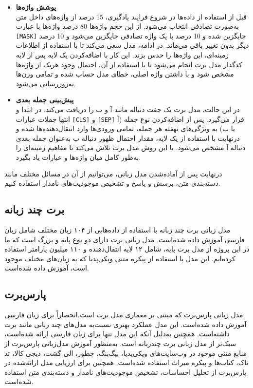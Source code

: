 \begin{itemize}
\item \textbf{پوشش واژه‌ها} \\
قبل از استفاده از داده‌ها در شروع فرایند یادگیری، 15 درصد از واژه‌های داخل متن به‌صورت تصادفی انتخاب می‌شود. 
 از این حجم واژه‌ها 80‌ درصد واژه‌ها با عبارت \verb|[MASK]| جایگزین شده و 10 درصد با یک واژه تصادفی جایگزین می‌شود و 10
 درصد دیگر بدون تغییر باقی می‌ماند. در ادامه، مدل سعی می‌کند تا با استفاده از اطلاعات زمینه‌ای، این واژه‌ها را حدس بزند.
 این کار با اضافه‌کردن یک لایه پس از لایه کدگذار مدل برت انجام می‌شود تا با استفاده از آن، احتمال وجود هریک از واژه‌ها
 مشخص شود و با داشتن واژه اصلی، خطای مدل حساب شده و تمامی وزن‌ها به‌روزرسانی می‌شود.

\item \textbf{پیش‌بینی جمله بعدی} \\
در این حالت، مدل برت یک جفت دنباله مانند آ و ب را دریافت می‌کند. در ابتدا و انتها جملات عبارات \verb|[CLS]| و \verb|[SEP]| قرار
 می‌گیرد. پس از اضافه‌کردن نوع جمله ($آ$ یا $ب$) به ویژگی‌های نهفته هر جمله، تمامی ورودی‌ها وارد انتقال‌دهنده‌ها شده و
 درنهایت با استفاده از یک لایه، مقدار احتمال ظهور دنباله $ب$ به‌عنوان جمله بعدی دنباله $آ$ مشخص می‌شود. با این روش مدل برت
 تلاش می‌کند تا مفاهیم زمینه‌ای را به‌طور کامل میان واژه‌ها و عبارات یاد بگیرد.
\end{itemize}

درنهایت پس از آماده‌شدن مدل زبانی، می‌توانیم از آن در مسائل مختلف مانند دسته‌بندی متن، پرسش و پاسخ و تشخیص
 موجودیت‌های نامدار استفاده کنیم.


\subsection{برت چند زبانه}
	مدل زبانی برت چند زبانه \citep{devlin2018bert} با استفاده از داده‌هایی از ۱۰۴ زبان مختلف شامل زبان فارسی آموزش داده شده‌است. مدل زبانی برت دارای دو نوع پایه و بزرگ است که ما در این پروژه از مدل برت پایه، شامل ۱۲ لایه انتقال‌دهنده و ۱۱۰ میلیون پارامتر استفاده کرده‌ایم. این مدل با استفاده از پیکره متنی ویکی‌پدیا که به زبان‌های مختلف موجود است، آموزش داده شده‌است. 
	
\subsection{پارس‌برت}
	\cite{ParsBERT}
	مدل زبانی پارس‌برت که مبتنی بر معماری مدل برت است،انحصاراً برای زبان فارسی آموزش داده شده‌است. این مدل عملکرد بهتری نسبت‌به مدل‌های چند زبانی مانند برت داشته‌است. همچنین به‌دلیل آنکه این مدل تنها برای زبان فارسی ارائه شده‌است، سبک‌تر از مدل زبانی برت چندزبانه است. به‌منظور آموزش مدل‌زبانی پارس‌برت از منابع متنی موجود در وب‌سایت‌های ویکی‌پدیا، بیگ‌بنگ، چطور، الی گشت، دیجی کالا، تد تاک، کتاب‌ها و پیکره میراث استفاده شده‌است. همچنین برای ارزیابی مدل‌ ارائه‌شده در پارس‌برت از تحلیل احساسات، تشخیص موجودیت‌های نامدار و دسته‌بندی متن استفاده شده‌است.
	

